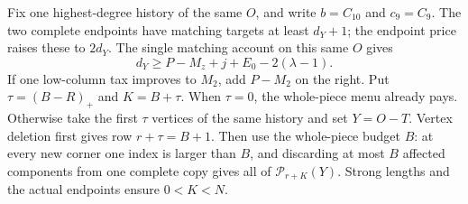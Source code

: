 \documentclass[11pt,a4paper]{article}
\newcommand{\p}{\mathcal P}
\theoremstyle{definition}
\begin{document}
Fix one highest-degree history of the same $O$, and write $b=C_{10}$ and $c_9=C_9$. The two complete endpoints have matching targets at least $d_Y+1$; the endpoint price raises these to $2d_Y$. The single matching account on this same $O$ gives
\begin{equation}\label{eq:D10-dy}
 d_Y\ge P-M_z+j+E_0-2(\lambda-1).
\end{equation}
If one low-column tax improves to $M_2$, add $P-M_2$ on the right. Put $\tau=(B-R)_+$ and $K=B+\tau$. When $\tau=0$, the whole-piece menu already pays. Otherwise take the first $\tau$ vertices of the same history and set $Y=O-T$. Vertex deletion first gives row $r+\tau=B+1$. Then use the whole-piece budget $B$: at every new corner one index is larger than $B$, and discarding at most $B$ affected components from one complete copy gives all of $\p_{r+K}(Y)$. Strong lengths and the actual endpoints ensure $0<K<N$.
\end{document}
